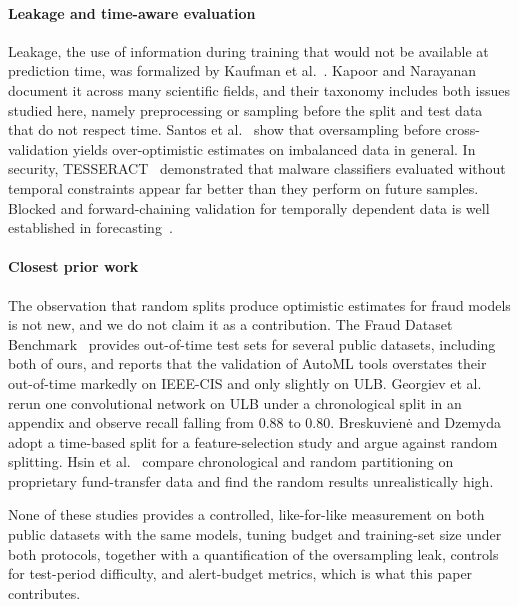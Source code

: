 \paragraph{Leakage and time-aware evaluation}
Leakage, the use of information during training that would not be available at prediction time, was formalized by Kaufman et al.~\cite{kaufman2012leakage}. Kapoor and Narayanan~\cite{kapoor2023leakage} document it across many scientific fields, and their taxonomy includes both issues studied here, namely preprocessing or sampling before the split and test data that do not respect time. Santos et al.~\cite{santos2018cross} show that oversampling before cross-validation yields over-optimistic estimates on imbalanced data in general. In security, TESSERACT~\cite{pendlebury2019tesseract} demonstrated that malware classifiers evaluated without temporal constraints appear far better than they perform on future samples. Blocked and forward-chaining validation for temporally dependent data is well established in forecasting~\cite{bergmeir2012use}.

\paragraph{Closest prior work}
The observation that random splits produce optimistic estimates for fraud models is not new, and we do not claim it as a contribution. The Fraud Dataset Benchmark~\cite{grover2022fraud} provides out-of-time test sets for several public datasets, including both of ours, and reports that the validation \rocauc{} of AutoML tools overstates their out-of-time \rocauc{} markedly on IEEE-CIS and only slightly on ULB. Georgiev et al.~\cite{georgiev2026modeling} rerun one convolutional network on ULB under a chronological split in an appendix and observe recall falling from 0.88 to 0.80. Breskuvien\.{e} and Dzemyda~\cite{breskuviene2024enhancing} adopt a time-based split for a feature-selection study and argue against random splitting. Hsin et al.~\cite{hsin2022feature} compare chronological and random partitioning on proprietary fund-transfer data and find the random results unrealistically high.

None of these studies provides a controlled, like-for-like measurement on both public datasets with the same models, tuning budget and training-set size under both protocols, together with a quantification of the oversampling leak, controls for test-period difficulty, and alert-budget metrics, which is what this paper contributes.
